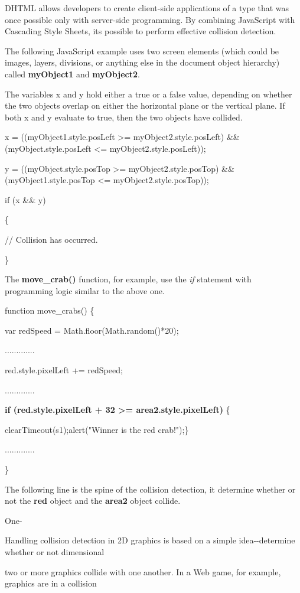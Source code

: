 \documentclass[
]{article}
\begin{document}
DHTML allows developers to create client-side applications of a type
that was once possible only with server-side programming. By combining
JavaScript with Cascading Style Sheets, it\textquotesingle s possible to
perform effective collision detection.

The following JavaScript example uses two screen elements (which could
be images, layers, divisions, or anything else in the document object
hierarchy) called \textbf{myObject1} and \textbf{myObject2}.

The variables x and y hold either a true or a false value, depending on
whether the two objects overlap on either the horizontal plane or the
vertical plane. If both x and y evaluate to true, then the two objects
have collided.

x = ((myObject1.style.posLeft \textgreater= myObject2.style.posLeft)
\&\& (myObject.style.posLeft \textless= myObject2.style.posLeft));

y = ((myObject.style.posTop \textgreater= myObject2.style.posTop) \&\&
(myObject1.style.posTop \textless= myObject2.style.posTop));

if (x \&\& y)

\{

// Collision has occurred.

\}

The \textbf{move\_crab()} function, for example, use the \emph{if}
statement with programming logic similar to the above one.

function move\_crabs() \{

var redSpeed = Math.floor(Math.random()*20);

.............

red.style.pixelLeft += redSpeed;

.............

\textbf{if (red.style.pixelLeft + 32 \textgreater=
area2.style.pixelLeft)} \{

clearTimeout(s1);alert("Winner is the red crab!");\}

.............

\}

The following line is the spine of the collision detection, it determine
whether or not the \textbf{red} object and the \textbf{area2} object
collide.

One-

Handling collision detection in 2D graphics is based on a simple
idea-\/-determine whether or not dimensional

two or more graphics collide with one another. In a Web game, for
example, graphics are in a collision
\end{document}
